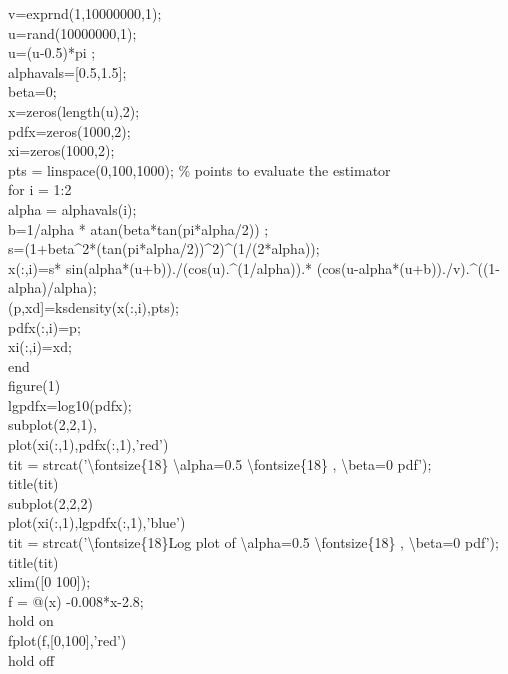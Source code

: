 \documentclass[twoside,twocolumn]{article}
\begin{document}
\begin{itshape}
v=exprnd(1,10000000,1);\\
u=rand(10000000,1);\\
u=(u-0.5)*pi ;\\
alphavals=[0.5,1.5];\\
beta=0;\\
x=zeros(length(u),2);\\
pdfx=zeros(1000,2);\\
xi=zeros(1000,2);\\
pts = linspace(0,100,1000); \% points to evaluate the estimator\\
for i = 1:2\\
alpha = alphavals(i);\\
b=1/alpha * atan(beta*tan(pi*alpha/2)) ;\\
s=(1+beta\^{}2*(tan(pi*alpha/2))\^{}2)\^{}(1/(2*alpha));\\
x(:,i)=s* sin(alpha*(u+b))./(cos(u).\^{}(1/alpha)).* (cos(u-alpha*(u+b))./v).\^{}((1-alpha)/alpha);\\ 
(p,xd]=ksdensity(x(:,i),pts);\\
pdfx(:,i)=p;\\
xi(:,i)=xd;\\
end\\
figure(1)\\
lgpdfx=log10(pdfx);\\
subplot(2,2,1),\\
plot(xi(:,1),pdfx(:,1),'red')\\
tit = strcat('\textbackslash fontsize\{18\} \textbackslash alpha=0.5 \textbackslash fontsize\{18\} , \textbackslash beta=0 pdf');\\
title(tit)\\
subplot(2,2,2)\\
plot(xi(:,1),lgpdfx(:,1),'blue')\\
tit = strcat('\textbackslash fontsize\{18\}Log plot of \textbackslash alpha=0.5 \textbackslash fontsize\{18\} , \textbackslash beta=0 pdf');\\
title(tit)\\
xlim([0 100]);\\
f = @(x) -0.008*x-2.8;\\
hold on\\
fplot(f,[0,100],'red')\\
hold off\\



\end{itshape}
\end{document}
